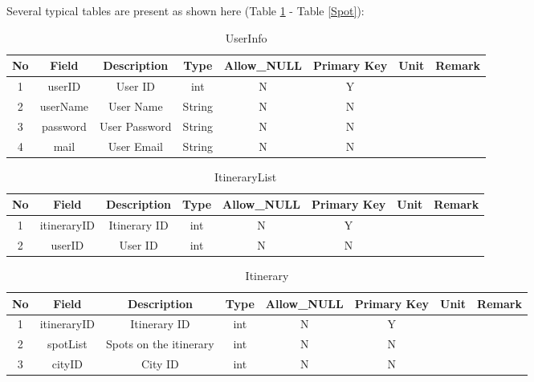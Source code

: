 \documentclass[10pt]{article}
\begin{document}
Several typical tables are present as shown here (Table \ref{UserInfo} - Table \ref{Spot}):

\begin{table}[htb]
	\centering

	\begin{tabular}{c|c|c|c|c|c|c|c} 
        \hline 
        No&Field&Description&Type&Allow\_NULL&Primary Key&Unit&Remark\\
		\hline
		1&userID&User ID&int&N&Y&&\\
		\hline
		2&userName&User Name&String&N&N&&\\
		\hline
		3&password&User Password&String&N&N&&\\
		\hline
		4&mail&User Email&String&N&N&&\\
		\hline
	\end{tabular}   
	
	\caption{UserInfo}\label{UserInfo}
\end{table}

\begin{table}[htb]
	\centering

	\begin{tabular}{c|c|c|c|c|c|c|c} 
        \hline 
        No&Field&Description&Type&Allow\_NULL&Primary Key&Unit&Remark\\
		\hline
		1&itineraryID&Itinerary ID&int&N&Y&&\\
		\hline
		2&userID&User ID&int&N&N&&\\
		\hline
	\end{tabular}   
	
	\caption{ItineraryList}\label{ItineraryList}
\end{table}

\begin{table}[htb]
	\centering

	\begin{tabular}{c|c|c|c|c|c|c|c} 
        \hline 
		No&Field&Description&Type&Allow\_NULL&Primary Key&Unit&Remark\\
		\hline
		1&itineraryID&Itinerary ID&int&N&Y&&\\
		\hline
		2&spotList&Spots on the itinerary&int&N&N&&\\
		\hline
		3&cityID&City ID&int&N&N&&\\
		\hline
	\end{tabular}   
	
	\caption{Itinerary}\label{Itinerary}
\end{table}
\end{document}
